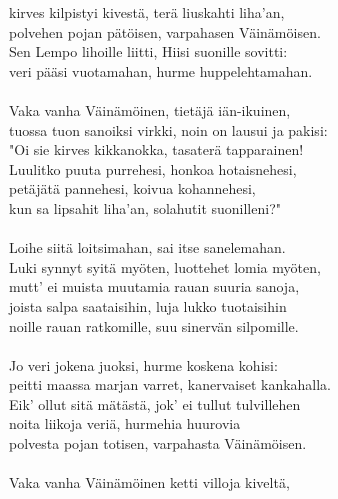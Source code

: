 kirves kilpistyi kivestä, terä liuskahti liha'an,               \\
polvehen pojan pätöisen, varpahasen Väinämöisen.                \\
Sen Lempo lihoille liitti, Hiisi suonille sovitti:              \\
veri pääsi vuotamahan, hurme huppelehtamahan.                   \\
                                                                \\
Vaka vanha Väinämöinen, tietäjä iän-ikuinen,                    \\
tuossa tuon sanoiksi virkki, noin on lausui ja pakisi:          \\
"Oi sie kirves kikkanokka, tasaterä tapparainen!                \\
Luulitko puuta purrehesi, honkoa hotaisnehesi,                  \\
petäjätä pannehesi, koivua kohannehesi,                         \\
kun sa lipsahit liha'an, solahutit suonilleni?"                 \\
                                                                \\
Loihe siitä loitsimahan, sai itse sanelemahan.                  \\
Luki synnyt syitä myöten, luottehet lomia myöten,               \\
mutt' ei muista muutamia rauan suuria sanoja,                   \\
joista salpa saataisihin, luja lukko tuotaisihin                \\
noille rauan ratkomille, suu sinervän silpomille.               \\
                                                                \\
Jo veri jokena juoksi, hurme koskena kohisi:                    \\
peitti maassa marjan varret, kanervaiset kankahalla.            \\
Eik' ollut sitä mätästä, jok' ei tullut tulvillehen             \\
noita liikoja veriä, hurmehia huurovia                          \\
polvesta pojan totisen, varpahasta Väinämöisen.                 \\
                                                                \\
Vaka vanha Väinämöinen ketti villoja kiveltä,                   \\
